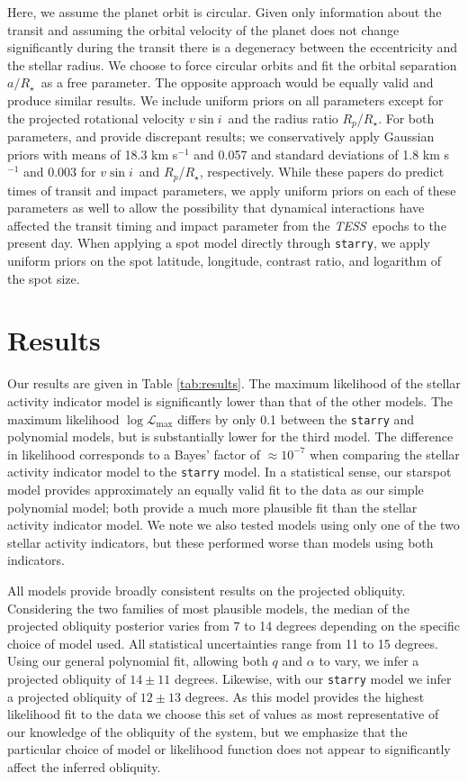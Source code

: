 \documentclass[twocolumn]{aastex63}
\newcommand{\tess}{{\it TESS}}
\newcommand{\vsini}{{$v \sin i$}}
\newcommand{\rstar}{{$R_\star$}}
\begin{document}
Here, we assume the planet orbit is circular. 
Given only information about the transit and assuming the orbital velocity of the planet does not change significantly during the transit there is a degeneracy between the eccentricity and the stellar radius. 
We choose to force circular orbits and fit the orbital separation $a/$\rstar\ as a free parameter. The opposite approach would be equally valid and produce similar results.
We include uniform priors on all parameters except for the projected rotational velocity \vsini\ and the radius ratio $R_p$/\rstar.
For both parameters, \citet{Benatti19} and \citet{Newton19} provide discrepant results; we conservatively apply Gaussian priors with means of 18.3 km s$^{-1}$ and 0.057 and standard deviations of 1.8 km s$^{-1}$ and 0.003 for \vsini\ and $R_p$/\rstar, respectively.
While these papers do predict times of transit and impact parameters, we apply uniform priors on each of these parameters as well to allow the possibility that dynamical interactions have affected the transit timing and impact parameter from the \tess\ epochs to the present day.
When applying a spot model directly through \texttt{starry}, we apply uniform priors on the spot latitude, longitude, contrast ratio, and logarithm of the spot size.


\section{Results}
\label{sec:results}

Our results are given in Table \ref{tab:results}. 
The maximum likelihood of the stellar activity indicator model is significantly lower than that of the other models. 
The maximum likelihood $\log \mathcal{L}_\textrm{max}$ differs by only 0.1 between the \texttt{starry} and polynomial models, but is substantially lower for the third model. 
The difference in likelihood corresponds to a Bayes' factor of $\approx 10^{-7}$ when comparing the stellar activity indicator model to the \texttt{starry} model.
In a statistical sense, our starspot model provides approximately an equally valid fit to the data as our simple polynomial model; both provide a much more plausible fit than the stellar activity indicator model.
We note we also tested models using only one of the two stellar activity indicators, but these performed worse than models using both indicators.

All models provide broadly consistent results on the projected obliquity. Considering the two families of most plausible models, the median of the projected obliquity posterior varies from 7 to 14 degrees depending on the specific choice of model used.
All statistical uncertainties range from 11 to 15 degrees.
Using our general polynomial fit, allowing both $q$ and $\alpha$ to vary, we infer a projected obliquity of $14 \pm 11$ degrees.
Likewise, with our \texttt{starry} model we infer a projected obliquity of $12 \pm 13$ degrees.
As this model provides the highest likelihood fit to the data we choose this set of values as most representative of our knowledge of the obliquity of the system, but we emphasize that the particular choice of model or likelihood function does not appear to significantly affect the inferred obliquity. 
\end{document}
